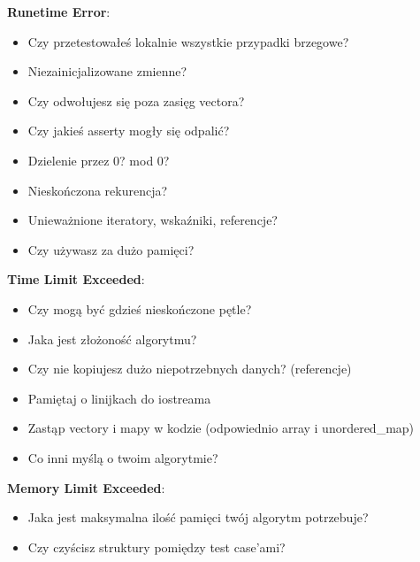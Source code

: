 {\textbf{Runetime Error}:
\begin{itemize}[noitemsep]
	\item Czy przetestowałeś lokalnie wszystkie przypadki brzegowe?
	\item Niezainicjalizowane zmienne?
	\item Czy odwołujesz się poza zasięg vectora?
	\item Czy jakieś asserty mogły się odpalić?
	\item Dzielenie przez 0? mod 0?
	\item Nieskończona rekurencja?
	\item Unieważnione iteratory, wskaźniki, referencje?
	\item Czy używasz za dużo pamięci?
\end{itemize}

\textbf{Time Limit Exceeded}:
\begin{itemize}[noitemsep]
	\item Czy mogą być gdzieś nieskończone pętle?
	\item Jaka jest złożoność algorytmu?
	\item Czy nie kopiujesz dużo niepotrzebnych danych? (referencje)
	\item Pamiętaj o linijkach do iostreama
	\item Zastąp vectory i mapy w kodzie (odpowiednio array i unordered\_map)
	\item Co inni myślą o twoim algorytmie?
\end{itemize}

\textbf{Memory Limit Exceeded}:
\begin{itemize}[noitemsep]
	\item Jaka jest maksymalna ilość pamięci twój algorytm potrzebuje?
	\item Czy czyścisz struktury pomiędzy test case'ami?
\end{itemize}
}
